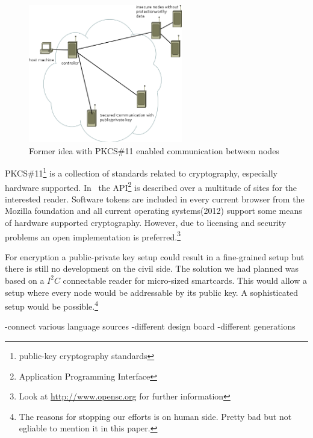 \begin{figure}[h]
   \centering
   \includegraphics[width=0.6\textwidth]{pic/pkcs11.png}%
   \caption{Former idea with PKCS\#11 enabled communication between nodes}
   \label{pkcs11}%
\end{figure}


\textsc{PKCS\#11}\footnote{public-key cryptography standards} is a collection of standards related to cryptography, especially hardware supported.
In~\cite{PKCS_RSA} the API\footnote{Application Programming Interface} is described over a multitude of sites for the interested reader.
Software tokens are included in every current browser from the Mozilla foundation and all current operating systems(2012) support some means of 
hardware supported cryptography. However, due to licensing and security problems an open implementation is preferred.\footnote{Look at \url{http://www.opensc.org} for further information}

For encryption a public-private key setup could result in a fine-grained setup but there is still no development on the civil side.
The solution we had planned was based on a \(I^2C\) connectable reader for micro-sized smartcards. This would allow a setup where every node
would be addressable by its public key. A sophisticated setup would be possible.\footnote{The reasons for stopping our efforts is on human side. Pretty
bad but not egliable to mention it in this paper.}


-connect various language sources
-different design board
-different generations

